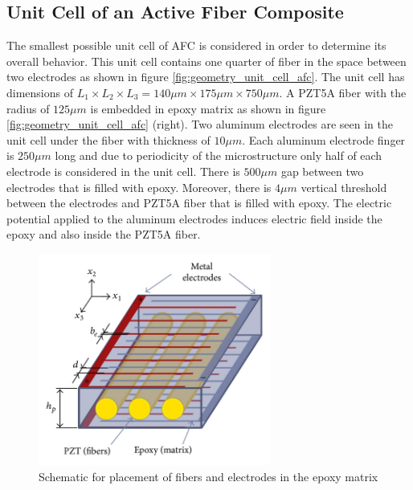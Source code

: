 \subsection{Unit Cell of an Active Fiber Composite}
The smallest possible unit cell of AFC is considered in order to determine its overall behavior.
This unit cell contains one quarter of fiber in the space between two electrodes as shown in figure \ref{fig:geometry_unit_cell_afc}.
The unit cell has dimensions of $L_1 \times L_2 \times L_3 =140 \mu m \times 175 \mu m \times 750 \mu m$.
A PZT5A fiber with the radius of $125 \mu m$ is embedded in epoxy matrix as shown in figure \ref{fig:geometry_unit_cell_afc} (right).
Two aluminum electrodes are seen in the unit cell under the fiber with thickness of $10 \mu m$. 
Each aluminum electrode finger is $250 \mu m$ long and due to periodicity of the microstructure only half of each electrode is considered in the unit cell.
There is $500 \mu m$ gap between two electrodes that is filled with epoxy.
Moreover, there is $4 \mu m$ vertical threshold between the electrodes and PZT5A fiber that is filled with epoxy.
The electric potential applied to the aluminum electrodes induces electric field inside the epoxy and also inside the PZT5A fiber.
\begin{figure} 
\centering
\includegraphics[width=3.0in]{./chap_4_structural_analyses/afc_unit_cell/schematic_afc_unit_cell.jpg}
\caption{Schematic for placement of fibers and electrodes in the epoxy matrix \cite{jemai2014mathematical}}
\label{fig:schematic_afc_unit_cell}
\end{figure}

